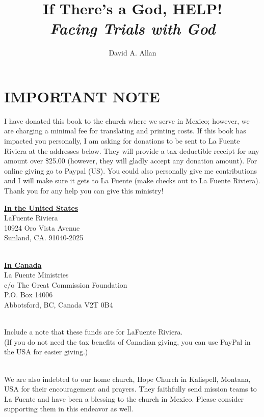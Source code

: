 \documentclass[twoside, 12pt]{book}
\begin{document}
\let\cleardoublepage\clearpage 
\frontmatter
\title{
	\fontsize{48}{57.6}\selectfont If There's a God, HELP!\\
	\textit{\fontsize{16}{19.2}\selectfont Facing Trials with God}
}
\author{\fontsize{24}{28.8}\selectfont David A. Allan}
\date{}
\maketitle

\chapter*{IMPORTANT NOTE}
I have donated this book to the church where we serve in Mexico; however, we are charging a minimal fee for translating and printing costs. If this book has impacted you personally, I am asking for donations to be sent to La Fuente Riviera at the addresses below. They will provide a tax-deductible receipt for any amount over \$25.00 (however, they will gladly accept any donation amount). For online giving go to Paypal (US). You could also personally give me contributions and I will make sure it gets to La Fuente (make checks out to La Fuente Riviera). Thank you for any help you can give this ministry!\\

\begin{center}
\underline{\textbf{In the United States}}\\
LaFuente Riviera\\
10924 Oro Vista Avenue\\
Sunland, CA. 91040-2025\\
\

\clearpage

\underline{\textbf{In Canada}}\\
La Fuente Ministries\\
c/o The Great Commission Foundation\\
P.O. Box 14006\\
Abbotsford, BC, Canada V2T 0B4\\
\

Include a note that these funds are for LaFuente Riviera.\\
(If you do not need the tax benefits of Canadian giving, you can use PayPal in the USA for easier giving.)\\
\

\end{center}

We are also indebted to our home church, Hope Church in Kalispell, Montana, USA for their encouragement and prayers. They faithfully send mission teams to La Fuente and have been a blessing to the church in Mexico. Please consider supporting them in this endeavor as well.\\
\
\end{document}

